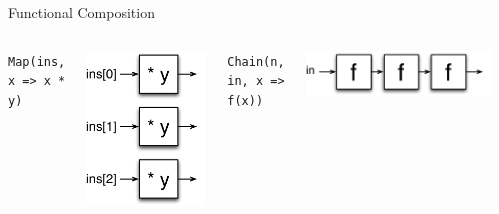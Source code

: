 \documentclass[xcolor=pdflatex,dvipsnames,table]{beamer}
\begin{document}
\begin{frame}[fragile]{Functional Composition}
\begin{columns}

\verb+Map(ins, x => x * y)+ \\
\begin{center}
\includegraphics[height=0.6\textheight]{figs/map.pdf} \\[2cm]
\end{center}

\vskip2mm
\verb+Chain(n, in, x => f(x))+ \\
\begin{center}
\includegraphics[width=0.9\textwidth]{figs/chain.pdf} \\
\end{center}


\end{columns}
\end{frame}
\end{document}
